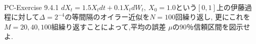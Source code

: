 \documentclass[dvipdfmx,cjk]{beamer}
\numberwithin{equation}{section}
\newlength{\cellleftmargin}
\newlength{\smallerfontscale}
\def\smaller{\fontsize{\smallerfontscale}{\smallerfontscale}\selectfont}
\begin{document}
\begin{frame} 
    \begin{addmargin}[\cellleftmargin]{0em}%
    {\smaller%
    \vspace{-1\smallerfontscale}%
    
    \begin{center}
    \end{center}
    { \hspace*{\fill} \\}
    }%
    \end{addmargin}%
\end{frame}

\begin{frame}{PC-Exercise 9.4.1}
$dX_t = 1.5 X_t dt + 0.1 X_t dW_t ,\ X_0 =1.0$という$[0,1]$上の伊藤過程に対して$\Delta= 2^{-4}$の等間隔のオイラー近似を$N=100$回繰り返し,
更にこれを$M=20,40,100$組繰り返すことによって,平均の誤差 $\mu$の90％信頼区間を図示せよ.
\end{frame}
\end{document}
